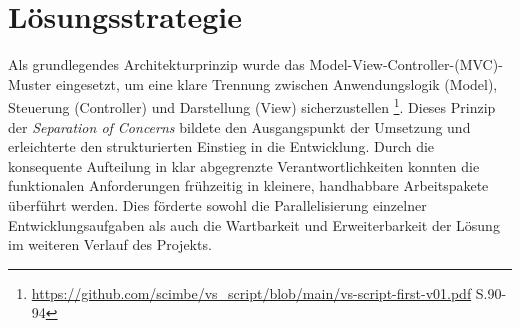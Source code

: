 \chapter{Lösungsstrategie}
Als grundlegendes Architekturprinzip wurde das Model-View-Controller-(MVC)-Muster eingesetzt, um eine klare Trennung zwischen Anwendungslogik (Model), Steuerung (Controller) und Darstellung (View) sicherzustellen
\footnote{\url{https://github.com/scimbe/vs_script/blob/main/vs-script-first-v01.pdf} S.90-94}. 
Dieses Prinzip der \textit{Separation of Concerns} bildete den Ausgangspunkt der Umsetzung und erleichterte den strukturierten Einstieg in die Entwicklung. 
Durch die konsequente Aufteilung in klar abgegrenzte Verantwortlichkeiten konnten die funktionalen Anforderungen frühzeitig in kleinere, handhabbare Arbeitspakete überführt werden. 
Dies förderte sowohl die Parallelisierung einzelner Entwicklungsaufgaben als auch die Wartbarkeit und Erweiterbarkeit der Lösung im weiteren Verlauf des Projekts.



\clearpage
